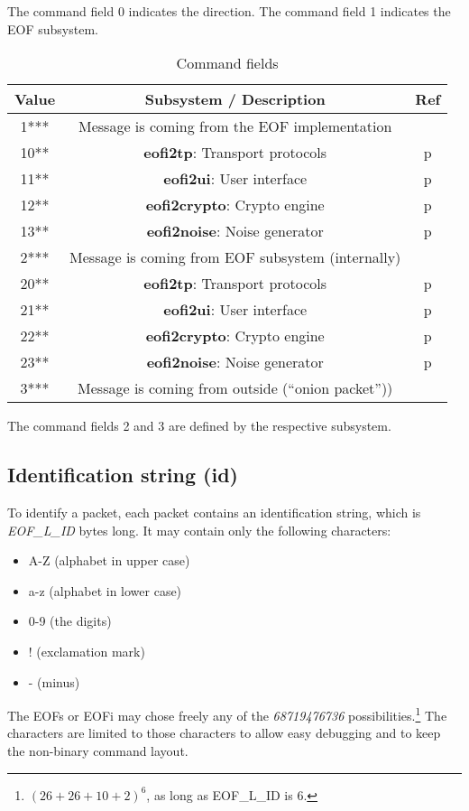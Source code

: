 The command field 0 indicates the direction.
The command field 1 indicates the EOF subsystem.
\begin{longtable}{|c|c|c|}
\caption{Command fields}\\
\hline
\textbf{Value} & \textbf{Subsystem} / \textbf{Description} & \textbf{Ref}\\
\hline
1*** & Message is coming from the EOF implementation &\\
\hline
10** & \textbf{eofi2tp}: Transport protocols & p\pageref{eofi2tp}\\
\hline
11** & \textbf{eofi2ui}: User interface & p\pageref{eofi2ui}\\
\hline
12** & \textbf{eofi2crypto}: Crypto engine & p\pageref{eofi2crypto}\\
\hline
13** & \textbf{eofi2noise}: Noise generator & p\pageref{eofi2noise}\\
\hline
2*** & Message is coming from EOF subsystem (internally) &\\
\hline
20** & \textbf{eofi2tp}: Transport protocols & p\pageref{eofi2tp}\\
\hline
21** & \textbf{eofi2ui}: User interface & p\pageref{eofi2ui}\\
\hline
22** & \textbf{eofi2crypto}: Crypto engine & p\pageref{eofi2crypto}\\
\hline
23** & \textbf{eofi2noise}: Noise generator & p\pageref{eofi2noise}\\
\hline
3*** & Message is coming from outside ("`onion packet"')) &\\
\hline
\end{longtable}
The command fields 2 and 3 are defined by the respective subsystem.
\subsection{Identification string (id)}
\label{idn}
To identify a packet, each packet contains an identification string,
which is \emph{EOF\_L\_ID} bytes long. It may contain only the
following characters:
\begin{itemize}
\item A-Z (alphabet in upper case)
\item a-z (alphabet in lower case)
\item 0-9 (the digits)
\item ! (exclamation mark)
\item - (minus)
\end{itemize}
The EOFs or EOFi may chose freely any of the \emph{68719476736}
possibilities.\footnote{$(26+26+10+2)^6$, as long as EOF\_L\_ID is 6.}
The characters are limited to those characters to allow easy debugging
and to keep the non-binary command layout.
